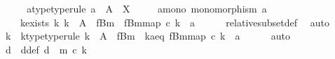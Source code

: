\begin{isabellebody}
\ \ \isamarkupfalse%
\ \isamarkupfalse%
\ a{\isacharunderscore}{\kern0pt}type{\isacharbrackleft}{\kern0pt}type{\isacharunderscore}{\kern0pt}rule{\isacharbrackright}{\kern0pt}{\isacharcolon}{\kern0pt}\ {\isachardoublequoteopen}a\ {\isacharcolon}{\kern0pt}\ A\ {\isasymrightarrow}\ X{\isachardoublequoteclose}\ \isanewline
\ \ \ \ a{\isacharunderscore}{\kern0pt}mono{\isacharcolon}{\kern0pt}\ {\isachardoublequoteopen}monomorphism\ a{\isachardoublequoteclose}\ \isanewline
\ \ \ \ k{\isacharunderscore}{\kern0pt}exists{\isacharcolon}{\kern0pt}\ {\isachardoublequoteopen}{\isasymexists}k{\isachardot}{\kern0pt}\ k\ {\isacharcolon}{\kern0pt}\ A\ {\isasymrightarrow}\ f\isactrlsup {\isacharminus}{\kern0pt}B{\isasymrparr}\isactrlbsub m\isactrlesub \ {\isasymand}\ {\isacharbrackleft}{\kern0pt}f\isactrlsup {\isacharminus}{\kern0pt}B{\isasymrparr}\isactrlbsub m\isactrlesub {\isacharbrackright}{\kern0pt}map\ {\isasymcirc}\isactrlsub c\ k\ {\isacharequal}{\kern0pt}\ a{\isachardoublequoteclose}\isanewline
\ \ \ \ \isamarkupfalse%
\ relative{\isacharunderscore}{\kern0pt}subset{\isacharunderscore}{\kern0pt}def{}\ \isamarkupfalse%
\ auto\isanewline
\ \ \isamarkupfalse%
\ \isamarkupfalse%
\ k\ \ k{\isacharunderscore}{\kern0pt}type{\isacharbrackleft}{\kern0pt}type{\isacharunderscore}{\kern0pt}rule{\isacharbrackright}{\kern0pt}{\isacharcolon}{\kern0pt}\ {\isachardoublequoteopen}k\ {\isacharcolon}{\kern0pt}\ A\ {\isasymrightarrow}\ f\isactrlsup {\isacharminus}{\kern0pt}B{\isasymrparr}\isactrlbsub m\isactrlesub {\isachardoublequoteclose}\ \ k{\isacharunderscore}{\kern0pt}a{\isacharunderscore}{\kern0pt}eq{\isacharcolon}{\kern0pt}\ {\isachardoublequoteopen}{\isacharbrackleft}{\kern0pt}f\isactrlsup {\isacharminus}{\kern0pt}B{\isasymrparr}\isactrlbsub m\isactrlesub {\isacharbrackright}{\kern0pt}map\ {\isasymcirc}\isactrlsub c\ k\ {\isacharequal}{\kern0pt}\ a{\isachardoublequoteclose}\isanewline
\ \ \ \ \isamarkupfalse%
\ auto\isanewline
\isanewline
\ \ \isamarkupfalse%
\ d\ \ d{\isacharunderscore}{\kern0pt}def{\isacharcolon}{\kern0pt}\ {\isachardoublequoteopen}d\ {\isacharequal}{\kern0pt}\ m{\isacharprime}{\kern0pt}\ {\isasymcirc}\isactrlsub c\ k{\isachardoublequoteclose}\isanewline
\ \ \ \ \isamarkupfalse%

\end{isabellebody}
